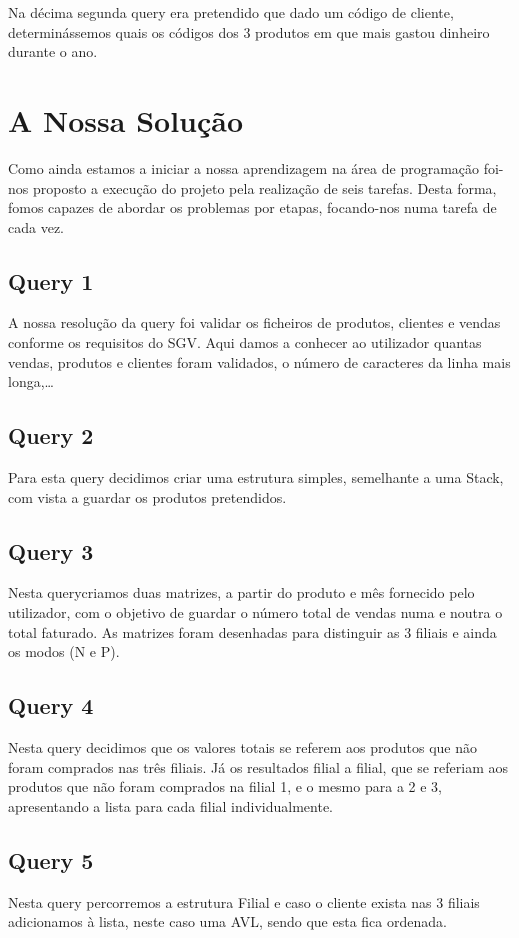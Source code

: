 \documentclass[a4paper,11pt]{report}
\begin{document}
Na décima segunda query era pretendido que dado um código de cliente, determinássemos quais os códigos dos 3 produtos em que mais gastou dinheiro durante o ano.

\chapter{A Nossa Solução}
\label{sec:solucao}
\quad Como ainda estamos a iniciar a nossa aprendizagem na área de programação foi-nos proposto a execução do projeto pela realização de seis tarefas.
Desta forma, fomos capazes de abordar os problemas por etapas, focando-nos numa tarefa de cada vez.

\section*{Query 1}
A nossa resolução da query foi validar os ficheiros de produtos, clientes e vendas conforme os requisitos do SGV. Aqui damos a conhecer ao utilizador quantas vendas, produtos e clientes foram validados, o número de caracteres da linha mais longa,…

\section*{Query 2}
Para esta query decidimos criar uma estrutura simples, semelhante a uma Stack, com vista a guardar os produtos pretendidos.


\section*{Query 3}
Nesta querycriamos duas matrizes, a partir do produto e mês fornecido pelo utilizador, com o objetivo de guardar o número total de vendas numa e noutra o total faturado. As matrizes foram desenhadas para distinguir as 3 filiais e ainda os modos (N e P).


\section*{Query 4}
Nesta query decidimos que os valores totais se referem aos produtos que não foram comprados nas três filiais. Já os resultados filial a filial, que se referiam aos produtos que não foram comprados na filial 1, e o mesmo para a 2 e 3, apresentando a lista para cada filial individualmente.

\section*{Query 5}
Nesta query percorremos a estrutura Filial e caso o cliente exista nas 3 filiais adicionamos à lista, neste caso uma AVL, sendo que esta fica ordenada.
\end{document}
